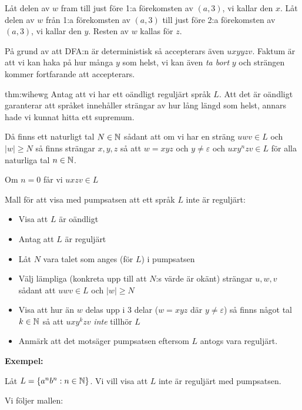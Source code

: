 \noindent Låt delen av $w$ fram till just före 1:a förekomsten av $(a,3)$, vi kallar den $x$. Låt delen av $w$ från 1:a förekomsten av $(a,3)$ till just före 2:a förekomsten av $(a,3)$, vi kallar den $y$. Resten av $w$ kallas för $z$.
\par\bigskip
\noindent På grund av att DFA:n är deterministisk så accepterars även $uxyyzv$. Faktum är att vi kan haka på hur många $y$ som helst, vi kan även \textit{ta bort} $y$ och strängen kommer fortfarande att accepterars.
\par\bigskip
\begin{theo}{thm:wihewg}
  Antag att vi har ett oändligt reguljärt språk $L$. Att det är oändligt garanterar att språket innehåller strängar av hur lång längd som helst, annars hade vi kunnat hitta ett supremum.
  \par\bigskip
  \noindent Då finns ett naturligt tal $N\in\mathbb{N}$ sådant att om vi har en sträng $uwv\in L$ och $\left|w\right|\geq N$ så finns strängar $x,y,z$ så att $w=xyz$ och $y\neq\varepsilon$ och $uxy^nzv\in L$ för alla naturliga tal $n\in\mathbb{N}$.\par
  \noindent Om $n=0$ får vi $uxzv\in L$
\end{theo}
\par\bigskip
\noindent Mall för att visa med pumpsatsen att ett språk $L$ inte är reguljärt:
\begin{itemize}
  \item Visa att $L$ är oändligt
  \item Antag att $L$ är reguljärt
  \item Låt $N$ vara talet som anges (för $L$) i pumpsatsen
  \item Välj lämpliga (konkreta upp till att $N$:s värde är okänt) strängar $u,w,v$ sådant att $uwv\in L$ och $\left|w\right|\geq N$
  \item Visa att hur än $w$ delas upp i 3 delar ($w=xyz$ där $y\neq\varepsilon$) så finns något tal $k\in\mathbb{N}$ så att $uxy^kzv$ \textit{inte} tillhör $L$
  \item Anmärk att det motsäger pumpsatsen eftersom $L$ antogs vara reguljärt. 
\end{itemize}
\par\bigskip
\noindent\textbf{Exempel:}\par
\noindent Låt $L = \left\{a^nb^n:n\in\mathbb{N}\right\}$. Vi vill visa att $L$ inte är reguljärt med pumpsatsen.
\par\bigskip
\noindent Vi följer mallen:
